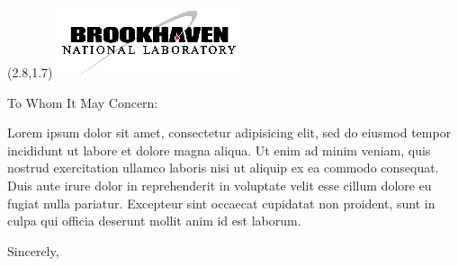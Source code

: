 \documentclass[12pt]{letter}
\begin{document}
\begin{textblock}{2}(2.8,1.7)
\includegraphics[scale=2.0]{bnl-logo}
\end{textblock}

\begin{letter}{}

\opening{To Whom It May Concern:}

Lorem ipsum dolor sit amet, consectetur adipisicing elit, sed do eiusmod tempor
incididunt ut labore et dolore magna aliqua. Ut enim ad minim veniam, quis
nostrud exercitation ullamco laboris nisi ut aliquip ex ea commodo consequat.
Duis aute irure dolor in reprehenderit in voluptate velit esse cillum dolore eu
fugiat nulla pariatur. Excepteur sint occaecat cupidatat non proident, sunt in
culpa qui officia deserunt mollit anim id est laborum.

\closing{Sincerely,}

\end{letter}
\end{document}
